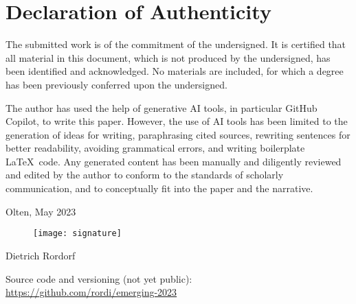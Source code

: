 \vspace*{3cm}

\section*{Declaration of Authenticity}

The submitted work is of the commitment of the undersigned. It is certified that all material
in this document, which is not produced by the undersigned, has been identified and acknowledged.
No materials are included, for which a degree has been previously conferred upon the undersigned.

\vspace*{0.5cm} 

\noindent The author has used the help of generative AI tools, in particular GitHub Copilot, to
write this paper. However, the use of AI tools has been limited to the generation of ideas for
writing, paraphrasing cited sources, rewriting sentences for better readability, avoiding grammatical
errors, and writing boilerplate \LaTeX\ code. Any generated content has been manually and diligently
reviewed and edited by the author to conform to the standards of scholarly communication, and to
conceptually fit into the paper and the narrative.

\vspace*{1cm} 
\noindent Olten, May 2023

\begin{figure}[h!]
    \texttt{[image: signature]}
\end{figure}
\noindent Dietrich Rordorf

\vspace*{2cm} 

\noindent Source code and versioning (not yet public):\\
\url{https://github.com/rordi/emerging-2023}

